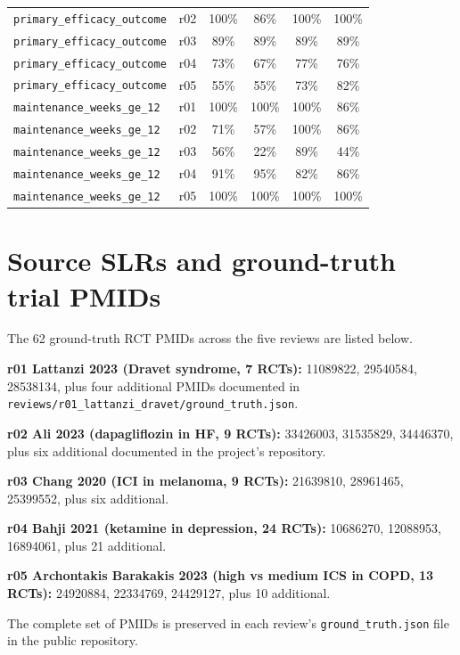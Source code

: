 \documentclass[a4paper,fleqn]{cas-sc}
\begin{document}
\begin{table}[ht]
\begin{tabular*}{\tblwidth}{@{}p{3.6cm}p{0.6cm}cccc@{}}
\texttt{primary\_efficacy\_outcome} & r02 & 100\% & 86\% & 100\% & 100\% \\
\texttt{primary\_efficacy\_outcome} & r03 & 89\% & 89\% & 89\% & 89\% \\
\texttt{primary\_efficacy\_outcome} & r04 & 73\% & 67\% & 77\% & 76\% \\
\texttt{primary\_efficacy\_outcome} & r05 & 55\% & 55\% & 73\% & 82\% \\
\midrule
\texttt{maintenance\_weeks\_ge\_12} & r01 & 100\% & 100\% & 100\% & 86\% \\
\texttt{maintenance\_weeks\_ge\_12} & r02 & 71\% & 57\% & 100\% & 86\% \\
\texttt{maintenance\_weeks\_ge\_12} & r03 & 56\% & 22\% & 89\% & 44\% \\
\texttt{maintenance\_weeks\_ge\_12} & r04 & 91\% & 95\% & 82\% & 86\% \\
\texttt{maintenance\_weeks\_ge\_12} & r05 & 100\% & 100\% & 100\% & 100\% \\
\bottomrule
\end{tabular*}
\end{table}

\section{Source SLRs and ground-truth trial PMIDs}\label{app:pmids}

The 62 ground-truth RCT PMIDs across the five reviews are listed below.

\textbf{r01 Lattanzi 2023 (Dravet syndrome, 7 RCTs):} 11089822, 29540584,
28538134, plus four additional PMIDs documented in
\texttt{reviews/r01\_lattanzi\_dravet/ground\_truth.json}.

\textbf{r02 Ali 2023 (dapagliflozin in HF, 9 RCTs):} 33426003, 31535829,
34446370, plus six additional documented in the project's repository.

\textbf{r03 Chang 2020 (ICI in melanoma, 9 RCTs):} 21639810, 28961465,
25399552, plus six additional.

\textbf{r04 Bahji 2021 (ketamine in depression, 24 RCTs):} 10686270,
12088953, 16894061, plus 21 additional.

\textbf{r05 Archontakis Barakakis 2023 (high vs medium ICS in COPD, 13 RCTs):}
24920884, 22334769, 24429127, plus 10 additional.

The complete set of PMIDs is preserved in each review's
\texttt{ground\_truth.json} file in the public repository.
\end{document}

